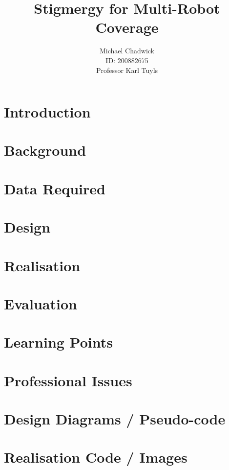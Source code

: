 \documentclass[openany,a4paper,12pt]{book}
\title{Stigmergy for Multi-Robot Coverage}
\author{Michael Chadwick \\ ID: 200882675 \\ Professor Karl Tuyls}
\begin{document}
\maketitle
\tableofcontents



\chapter{Introduction}


\chapter{Background}


\chapter{Data Required}


\chapter{Design}


\chapter{Realisation}


\chapter{Evaluation}


\chapter{Learning Points}


\chapter{Professional Issues}


\printbibliography

\appendix
\chapter{Design Diagrams / Pseudo-code}


\chapter{Realisation Code / Images}

\end{document}
